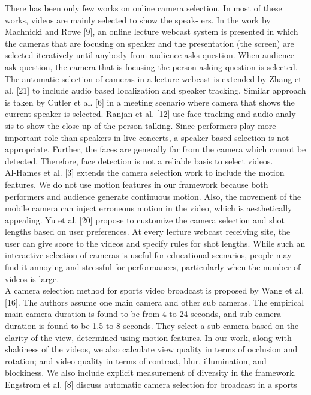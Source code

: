 \documentclass{sig-alternate}
\begin{document}
There has been only few works on online camera selection. In
most of these works, videos are mainly selected to show the speak-
ers. In the work by Machnicki and Rowe [9], an online lecture
webcast system is presented in which the cameras that are focusing
on speaker and the presentation (the screen) are selected iteratively
until anybody from audience asks question. When audience ask
question, the camera that is focusing the person asking question is
selected. The automatic selection of cameras in a lecture webcast
is extended by Zhang et al. [21] to include audio based localization
and speaker tracking. Similar approach is taken by Cutler et al. [6]
in a meeting scenario where camera that shows the current speaker
is selected. Ranjan et al. [12] use face tracking and audio analy-
sis to show the close-up of the person talking. Since performers
play more important role than speakers in live concerts, a speaker
based selection is not appropriate. Further, the faces are generally
far from the camera which cannot be detected. Therefore, face detection is not a reliable basis to select videos.\\
Al-Hames et al. [3] extends the camera selection work to include
the motion features. We do not use motion features in our framework because both performers and audience generate continuous
motion. Also, the movement of the mobile camera can inject erroneous motion in the video, which is aesthetically appealing. Yu et
al. [20] propose to customize the camera selection and shot lengths
based on user preferences. At every lecture webcast receiving site,
the user can give score to the videos and specify rules for shot
lengths. While such an interactive selection of cameras is useful
for educational scenarios, people may find it annoying and stressful for performances, particularly when the number of videos is
large.\\
A camera selection method for sports video broadcast is proposed by Wang et al. [16]. The authors assume one main camera and other sub cameras. The empirical main camera duration is
found to be from 4 to 24 seconds, and sub camera duration is found
to be 1.5 to 8 seconds. They select a sub camera based on the clarity of the view, determined using motion features. In our work,
along with shakiness of the videos, we also calculate view quality in terms of occlusion and rotation; and video quality in terms
of contrast, blur, illumination, and blockiness. We also include
explicit measurement of diversity in the framework. Engstrom et
al. [8] discuss automatic camera selection for broadcast in a sports
\end{document}
